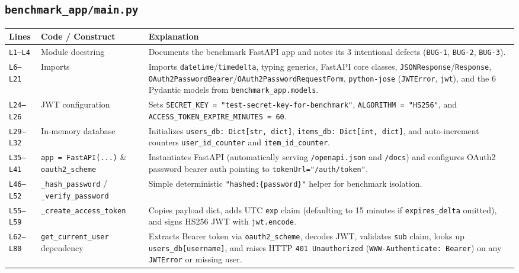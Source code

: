 \documentclass[11pt,a4paper]{article}
\begin{document}
\subsection{\texttt{benchmark\_app/main.py}}
\begin{longtable}{L{1.4cm} L{5.2cm} L{9.0cm}}
\toprule
\textbf{Lines} & \textbf{Code / Construct} & \textbf{Explanation} \\
\midrule
\endhead
\texttt{L1--L4} & Module docstring & Documents the benchmark FastAPI app and notes its 3 intentional defects (\texttt{BUG-1}, \texttt{BUG-2}, \texttt{BUG-3}). \\
\texttt{L6--L21} & Imports & Imports \texttt{datetime}/\texttt{timedelta}, typing generics, FastAPI core classes, \texttt{JSONResponse}/\texttt{Response}, \texttt{OAuth2PasswordBearer}/\texttt{OAuth2PasswordRequestForm}, \texttt{python-jose} (\texttt{JWTError}, \texttt{jwt}), and the 6 Pydantic models from \texttt{benchmark\_app.models}. \\
\texttt{L24--L26} & JWT configuration & Sets \texttt{SECRET\_KEY = "test-secret-key-for-benchmark"}, \texttt{ALGORITHM = "HS256"}, and \texttt{ACCESS\_TOKEN\_EXPIRE\_MINUTES = 60}. \\
\texttt{L29--L32} & In-memory database & Initializes \texttt{users\_db: Dict[str, dict]}, \texttt{items\_db: Dict[int, dict]}, and auto-increment counters \texttt{user\_id\_counter} and \texttt{item\_id\_counter}. \\
\texttt{L35--L41} & \texttt{app = FastAPI(...)} \& \texttt{oauth2\_scheme} & Instantiates FastAPI (automatically serving \texttt{/openapi.json} and \texttt{/docs}) and configures OAuth2 password bearer auth pointing to \texttt{tokenUrl="/auth/token"}. \\
\texttt{L46--L52} & \texttt{\_hash\_password} / \texttt{\_verify\_password} & Simple deterministic \texttt{"hashed:\{password\}"} helper for benchmark isolation. \\
\texttt{L55--L59} & \texttt{\_create\_access\_token} & Copies payload dict, adds UTC \texttt{exp} claim (defaulting to 15 minutes if \texttt{expires\_delta} omitted), and signs HS256 JWT with \texttt{jwt.encode}. \\
\texttt{L62--L80} & \texttt{get\_current\_user} dependency & Extracts Bearer token via \texttt{oauth2\_scheme}, decodes JWT, validates \texttt{sub} claim, looks up \texttt{users\_db[username]}, and raises HTTP \texttt{401 Unauthorized} (\texttt{WWW-Authenticate: Bearer}) on any \texttt{JWTError} or missing user. \\

\end{longtable}
\end{document}
